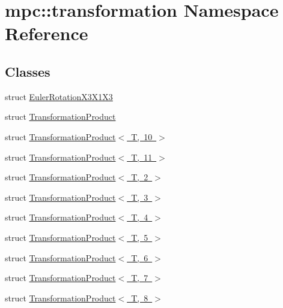 \hypertarget{namespacempc_1_1transformation}{}\section{mpc\+:\+:transformation Namespace Reference}
\label{namespacempc_1_1transformation}
\subsection*{Classes}
\begin{DoxyCompactItemize}
\item 
struct \mbox{\hyperlink{structmpc_1_1transformation_1_1_euler_rotation_x3_x1_x3}{Euler\+Rotation\+X3\+X1\+X3}}
\item 
struct \mbox{\hyperlink{structmpc_1_1transformation_1_1_transformation_product}{Transformation\+Product}}
\item 
struct \mbox{\hyperlink{structmpc_1_1transformation_1_1_transformation_product_3_01_t_00_0110_01_4}{Transformation\+Product$<$ T, 10 $>$}}
\item 
struct \mbox{\hyperlink{structmpc_1_1transformation_1_1_transformation_product_3_01_t_00_0111_01_4}{Transformation\+Product$<$ T, 11 $>$}}
\item 
struct \mbox{\hyperlink{structmpc_1_1transformation_1_1_transformation_product_3_01_t_00_012_01_4}{Transformation\+Product$<$ T, 2 $>$}}
\item 
struct \mbox{\hyperlink{structmpc_1_1transformation_1_1_transformation_product_3_01_t_00_013_01_4}{Transformation\+Product$<$ T, 3 $>$}}
\item 
struct \mbox{\hyperlink{structmpc_1_1transformation_1_1_transformation_product_3_01_t_00_014_01_4}{Transformation\+Product$<$ T, 4 $>$}}
\item 
struct \mbox{\hyperlink{structmpc_1_1transformation_1_1_transformation_product_3_01_t_00_015_01_4}{Transformation\+Product$<$ T, 5 $>$}}
\item 
struct \mbox{\hyperlink{structmpc_1_1transformation_1_1_transformation_product_3_01_t_00_016_01_4}{Transformation\+Product$<$ T, 6 $>$}}
\item 
struct \mbox{\hyperlink{structmpc_1_1transformation_1_1_transformation_product_3_01_t_00_017_01_4}{Transformation\+Product$<$ T, 7 $>$}}
\item 
struct \mbox{\hyperlink{structmpc_1_1transformation_1_1_transformation_product_3_01_t_00_018_01_4}{Transformation\+Product$<$ T, 8 $>$}}
\item 

\end{DoxyCompactItemize}
